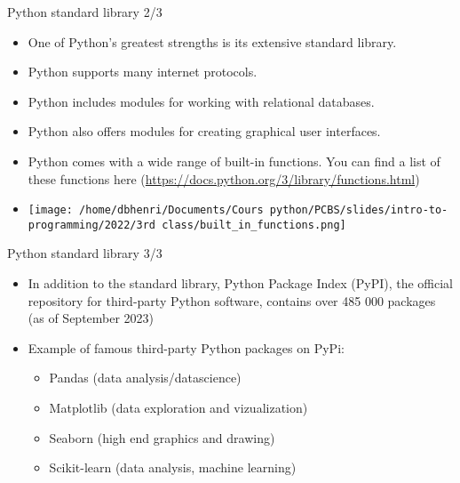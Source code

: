 \documentclass[
  8pt,
  ignorenonframetext,
]{beamer}
\providecommand{\tightlist}{%
  \setlength{\itemsep}{0pt}\setlength{\parskip}{0pt}}
\begin{document}
\begin{frame}{Python standard library 2/3}
\protect\hypertarget{python-standard-library-23}{}
\begin{itemize}[<+->]
\tightlist
\item
  One of Python's greatest strengths is its extensive standard library.
\end{itemize}

\begin{itemize}[<+->]
\tightlist
\item
  Python supports many internet protocols.
\end{itemize}

\begin{itemize}[<+->]
\tightlist
\item
  Python includes modules for working with relational databases.
\end{itemize}

\begin{itemize}[<+->]
\tightlist
\item
  Python also offers modules for creating graphical user interfaces.
\end{itemize}

\begin{itemize}[<+->]
\tightlist
\item
  Python comes with a wide range of built-in functions. You can find a
  list of these functions here
  (\url{https://docs.python.org/3/library/functions.html})
\end{itemize}

\begin{itemize}[<+->]
\tightlist
\item
  \texttt{[image: /home/dbhenri/Documents/Cours python/PCBS/slides/intro-to-programming/2022/3rd class/built\_in\_functions.png]}
\end{itemize}
\end{frame}

\begin{frame}{Python standard library 3/3}
\protect\hypertarget{python-standard-library-33}{}
\begin{itemize}
\item
  In addition to the standard library, Python Package Index (PyPI), the
  official repository for third-party Python software, contains over 485
  000 packages (as of September 2023)
\item
  Example of famous third-party Python packages on PyPi:

  \begin{itemize}
  \tightlist
  \item
    Pandas (data analysis/datascience)
  \item
    Matplotlib (data exploration and vizualization)
  \item
    Seaborn (high end graphics and drawing)
  \item
    Scikit-learn (data analysis, machine learning)
  \end{itemize}
\end{itemize}
\end{frame}
\end{document}
